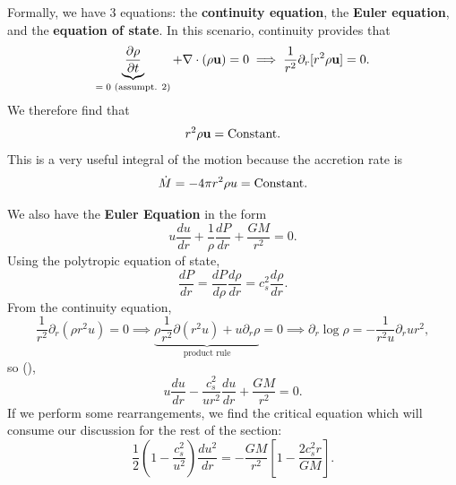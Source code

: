 Formally, we have 3 equations: the \textbf{continuity equation}, the \textbf{Euler equation}, and the \textbf{equation of state}. In this scenario, continuity provides that
\[
\underbrace{\frac{\partial \rho}{\partial t}}_{\text{$=0$ (assumpt. 2)}} + \nabla \cdot(\rho{\bf u}) = 0 \implies \frac{1}{r^2} \partial_r[r^2 \rho {\bf u}] = 0.
\]
We therefore find that
\[
r^2 \rho {\bf u} = \rm{Constant}.
\]
This is a very useful integral of the motion because the accretion rate is
\[
\dot{M} = -4\pi r^2 \rho u = {\rm Constant}.
\]
\par
We also have the \textbf{Euler Equation} in the form
\[
u \frac{du}{dr} + \frac{1}{\rho}\frac{dP}{dr} + \frac{GM}{r^2} = 0.
\]
Using the polytropic equation of state,
\[
\frac{dP}{dr} = \frac{dP}{d\rho} \frac{d\rho}{dr} = c_s^2 \frac{d\rho}{dr}.
\]
 From the continuity equation,
\[
\frac{1}{r^2} \partial_r (\rho r^2 u) = 0 \implies \underbrace{\rho \frac{1}{r^2}\partial(r^2u) + u \partial_r \rho}_{\text{product rule}} = 0 \implies \partial_r \log \rho = - \frac{1}{r^2 u} \partial_r ur^2,
\]
so (),
\[
u \frac{du}{dr} - \frac{c_s^2}{ur^2} \frac{du}{dr} + \frac{GM}{r^2} = 0.
\]
If we perform some rearrangements, we find the critical equation which will consume our discussion for the rest of the section:
\begin{equation}
    \boxed{
    \frac{1}{2}\left(1-\frac{c_s^2}{u^2}\right) \frac{du^2}{dr} = -\frac{GM}{r^2} \left[1-\frac{2c_s^2 r}{GM}\right].
    }
\end{equation}

